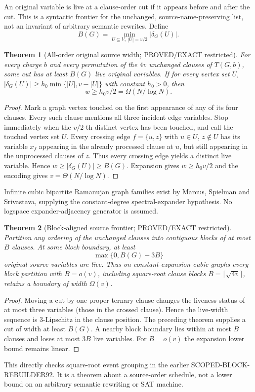 \documentclass[11pt]{article}
\newtheorem{theorem}{Theorem}
\begin{document}
An original variable is live at a clause-order cut if it appears before and after the cut. This is a syntactic frontier for the unchanged, source-name-preserving list, not an invariant of arbitrary semantic rewrites. Define
\[
B(G)=\min_{U\subseteq V,\ |U|=v/2}|\delta_G(U)|.
\]

\begin{theorem}[All-order original source width; PROVED/EXACT restricted]
For every charge $b$ and every permutation of the $4v$ unchanged clauses of $T(G,b)$, some cut has at least $B(G)$ live original variables. If for every vertex set $U$, $|\delta_G(U)|\ge h_0\min\{|U|,v-|U|\}$ with constant $h_0>0$, then
\[
w\ge h_0v/2=\Omega(N/\log N).
\]
\end{theorem}
\begin{proof}
Mark a graph vertex touched on the first appearance of any of its four clauses. Every such clause mentions all three incident edge variables. Stop immediately when the $v/2$-th distinct vertex has been touched, and call the touched vertex set $U$. Every crossing edge $f=\{u,z\}$ with $u\in U$, $z\notin U$ has its variable $x_f$ appearing in the already processed clause at $u$, but still appearing in the unprocessed clauses of $z$. Thus every crossing edge yields a distinct live variable. Hence $w\ge|\delta_G(U)|\ge B(G)$. Expansion gives $w\ge h_0v/2$ and the encoding gives $v=\Theta(N/\log N)$.
\end{proof}
Infinite cubic bipartite Ramanujan graph families exist by Marcus, Spielman and Srivastava, supplying the constant-degree spectral-expander hypothesis. No logspace expander-adjacency generator is assumed.

\begin{theorem}[Block-aligned source frontier; PROVED/EXACT restricted]
Partition any ordering of the unchanged clauses into contiguous blocks
of at most $B$ clauses. At some \emph{block boundary}, at least
\[
\boxed{\max\{0,B(G)-3B\}}
\]
original source variables are live. Thus on constant-expansion cubic
graphs every block partition with $B=o(v)$, including square-root
clause blocks $B=\lceil\sqrt{4v}\rceil$, retains a boundary of
width $\Omega(v)$.
\end{theorem}
\begin{proof}
Moving a cut by one proper ternary clause changes the liveness status
of at most three variables (those in the crossed clause). Hence the
live-width sequence is $3$-Lipschitz in the clause position. The
preceding theorem supplies a cut of width at least $B(G)$. A nearby
block boundary lies within at most $B$ clauses and loses at most $3B$
live variables. For $B=o(v)$ the expansion lower bound remains linear.
\end{proof}
This directly checks square-root event grouping in the earlier
SCOPED-BLOCK-REBUILDER92. It is a theorem about a source-order schedule,
not a lower bound on an arbitrary semantic rewriting or SAT machine.
\end{document}
